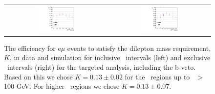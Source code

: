 \begin{figure}[!hb]
\begin{center}
\begin{tabular}{cc}
\includegraphics[width=0.4\textwidth]{plots/extractK_inclusive_bvetoMedium_92fb.pdf} &
\includegraphics[width=0.4\textwidth]{plots/extractK_exclusive_bvetoMedium_92fb.pdf} \\
\end{tabular}
\caption{
The efficiency for e$\mu$ events to satisfy the dilepton mass requirement, $K$, in data and simulation for inclusive \MET\ intervals (left) and
exclusive \MET\ intervals (right) for the targeted analysis, including the b-veto. 
Based on this we chose $K=0.13\pm0.02$ for the \MET\ regions up to \MET\ $>$ 100 GeV.
For higher \MET\ regions we chose $K=0.13\pm0.07$.
\label{fig:K_targeted}
}

\end{center}
\end{figure}
